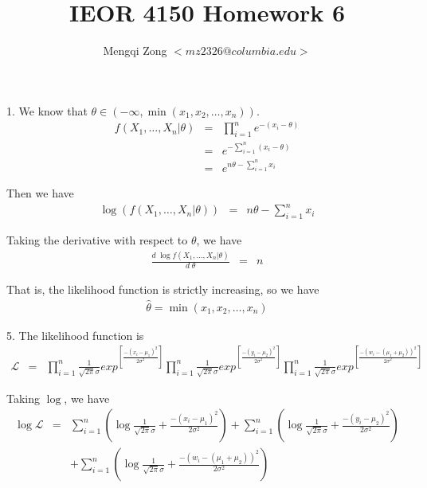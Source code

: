 \documentclass[12pt]{article}
\title{IEOR 4150 Homework 6}
\author{Mengqi Zong $<mz2326@columbia.edu>$}
\begin{document}
\maketitle

\setlength{\parindent}{0in}

1. We know that $\theta \in (-\infty, \min (x_1, x_2, \dots, x_n))$.
\begin{eqnarray*}
  f(X_1, \dots, X_n | \theta)
  &=& \prod_{i=1}^n e^{-(x_i - \theta)} \\
  &=& e^{- \sum_{i=1}^n (x_i - \theta)} \\
  &=& e^{n \theta - \sum_{i=1}^n x_i}
\end{eqnarray*}

Then we have
\begin{eqnarray*}
  \log {\left( f(X_1, \dots, X_n | \theta) \right)}
  &=& n \theta - \sum_{i=1}^n x_i
\end{eqnarray*}

Taking the derivative with respect to $\theta$, we have
\begin{eqnarray*}
  \frac {d \; \log f(X_1, \dots, X_n | \theta)}{d \; \theta}
  &=& n
\end{eqnarray*}

That is, the likelihood function is strictly increasing, so we have
\begin{eqnarray*}
  \hat{\theta} = \min (x_1, x_2, \dots, x_n)
\end{eqnarray*}

5. The likelihood function is
\begin{eqnarray*}
  \mathcal{L}
  &=& \prod_{i=1}^n \frac {1}{\sqrt{2\pi} \sigma}
  exp^{\left[ \frac{-(x_i - \mu_1)^2}{2\sigma^2} \right]}
  \prod_{i=1}^n \frac {1}{\sqrt{2\pi} \sigma}
  exp^{\left[ \frac{-(y_i - \mu_2)^2}{2\sigma^2} \right]}
  \prod_{i=1}^n \frac {1}{\sqrt{2\pi} \sigma}
  exp^{\left[ \frac{-(w_i - (\mu_1+\mu_2))^2}{2\sigma^2} \right]}
\end{eqnarray*}

Taking $\log$, we have
\begin{eqnarray*}
  \log {\mathcal{L}}
  &=& \sum_{i=1}^n \left( \log {\frac {1}{\sqrt{2\pi} \sigma}} +
    \frac{-(x_i - \mu_1)^2}{2\sigma^2} \right) + 
  \sum_{i=1}^n \left( \log {\frac {1}{\sqrt{2\pi} \sigma}} +
    \frac{-(y_i - \mu_2)^2}{2\sigma^2} \right) \\
  && + \sum_{i=1}^n \left( \log {\frac {1}{\sqrt{2\pi} \sigma}} +
    \frac{-(w_i - (\mu_1+\mu_2))^2}{2\sigma^2} \right)
\end{eqnarray*}
\end{document}
